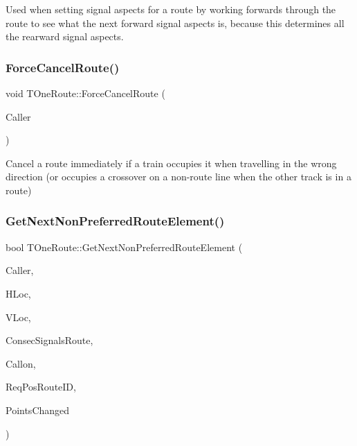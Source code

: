 Used when setting signal aspects for a route by working forwards through the route to see what the next forward signal aspects is, because this determines all the rearward signal aspects. \mbox{\label{class_t_one_route_a491fff1e619a9dc79774acf85eed72a5}} 
\subsubsection{\texorpdfstring{Force\+Cancel\+Route()}{ForceCancelRoute()}}
{\footnotesize\ttfamily void T\+One\+Route\+::\+Force\+Cancel\+Route (\begin{DoxyParamCaption}\item[{int}]{Caller }\end{DoxyParamCaption})}

Cancel a route immediately if a train occupies it when travelling in the wrong direction (or occupies a crossover on a non-\/route line when the other track is in a route) \mbox{\label{class_t_one_route_a997f3cb02d8e03d0a12769b8eb903674}} 
\subsubsection{\texorpdfstring{Get\+Next\+Non\+Preferred\+Route\+Element()}{GetNextNonPreferredRouteElement()}}
{\footnotesize\ttfamily bool T\+One\+Route\+::\+Get\+Next\+Non\+Preferred\+Route\+Element (\begin{DoxyParamCaption}\item[{int}]{Caller,  }\item[{int}]{H\+Loc,  }\item[{int}]{V\+Loc,  }\item[{bool}]{Consec\+Signals\+Route,  }\item[{bool}]{Callon,  }\item[{\mbox{\hyperlink{class_i_d_int}{I\+D\+Int}} \&}]{Req\+Pos\+Route\+ID,  }\item[{bool \&}]{Points\+Changed }\end{DoxyParamCaption})}

